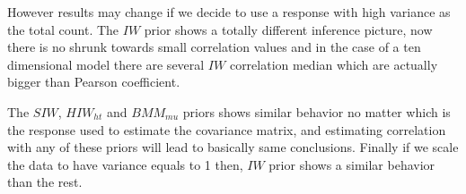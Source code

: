\documentclass[a4paper]{article}
\begin{document}
However results may change if we decide to use a response with high variance as the total count. The $IW$ prior shows a totally different inference picture, now there is no shrunk towards small correlation values and in the case of a ten dimensional model there are several $IW$ correlation median which are actually bigger than Pearson coefficient. 

The $SIW$, $HIW_{ht}$ and $BMM_{mu}$ priors shows similar behavior no matter which is the response used to estimate the covariance matrix, and estimating correlation with any of these priors will lead to basically same conclusions. Finally if we scale the data to have variance equals to 1 then, $IW$ prior shows a similar behavior than the rest.

\end{document}
